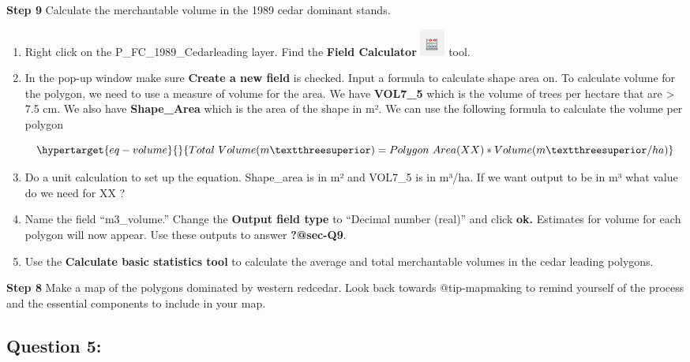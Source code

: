 \documentclass[
  letterpaper,
]{book}
\begin{document}
\textbf{Step 9} Calculate the merchantable volume in the 1989 cedar
dominant stands.

\begin{enumerate}
\def\labelenumi{\Alph{enumi}.}
\item
  Right click on the P\_FC\_1989\_Cedarleading layer. Find the
  \textbf{Field Calculator}
  \includegraphics{images/clipboard-1506137763.png} tool.
\item
  In the pop-up window make sure \textbf{Create a new field} is checked.
  Input a formula to calculate shape area on. To calculate volume for
  the polygon, we need to use a measure of volume for the area. We have
  \textbf{VOL7\_5} which is the volume of trees per hectare that are
  \textgreater{} 7.5 cm. We also have \textbf{Shape\_Area} which is the
  area of the shape in m². We can use the following formula to calculate
  the volume per polygon

  \begin{equation}\protect\hypertarget{eq-volume}{}{Total~Volume (m³) = Polygon~Area (XX) * Volume (m³/ha)}\label{eq-volume}\end{equation}
\item
  Do a unit calculation to set up the equation. Shape\_area is in m² and
  VOL7\_5 is in m³/ha. If we want output to be in m³ what value do we
  need for XX ?
\item
  Name the field ``m3\_volume.'' Change the \textbf{Output field type}
  to ``Decimal number (real)'' and click \textbf{ok.} Estimates for
  volume for each polygon will now appear. Use these outputs to answer
  \textbf{?@sec-Q9}.
\item
  Use the \textbf{Calculate basic statistics tool} to calculate the
  average and total merchantable volumes in the cedar leading polygons.
\end{enumerate}

\textbf{Step 8} Make a map of the polygons dominated by western
redcedar. Look back towards @tip-mapmaking to remind yourself of the
process and the essential components to include in your map.

\hypertarget{question-5}{%
\subsection*{Question 5:}\label{question-5}}
\end{document}
